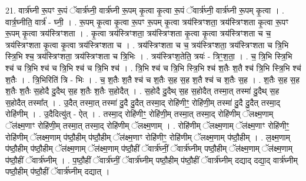 \documentclass[17pt]{extarticle}
\begin{document}
21. वार्त्र॑घ्नी रू॒पꣳ रू॒पं ॅवार्त्र॑घ्नी॒ वार्त्र॑घ्नी रू॒पम् कृ॒त्वा कृ॒त्वा रू॒पं ॅवार्त्र॑घ्नी॒ वार्त्र॑घ्नी रू॒पम् कृ॒त्वा । . वार्त्र॒घ्नीति॒ वार्त्र॑ - घ्नी॒ । . रू॒पम् कृ॒त्वा कृ॒त्वा रू॒पꣳ रू॒पम् कृ॒त्वा त्रय॑स्त्रिꣳशता॒ त्रय॑स्त्रिꣳशता कृ॒त्वा रू॒पꣳ रू॒पम् कृ॒त्वा त्रय॑स्त्रिꣳशता । . कृ॒त्वा त्रय॑स्त्रिꣳशता॒ त्रय॑स्त्रिꣳशता कृ॒त्वा कृ॒त्वा त्रय॑स्त्रिꣳशता च च॒ त्रय॑स्त्रिꣳशता कृ॒त्वा कृ॒त्वा त्रय॑स्त्रिꣳशता च । . त्रय॑स्त्रिꣳशता च च॒ त्रय॑स्त्रिꣳशता॒ त्रय॑स्त्रिꣳशता च त्रि॒भि स्त्रि॒भि श्च॒ त्रय॑स्त्रिꣳशता॒ त्रय॑स्त्रिꣳशता च त्रि॒भिः । . त्रय॑स्त्रिꣳश॒तेति॒ त्रयः॑ - त्रिꣳ॒॒श॒ता॒ । . च॒ त्रि॒भि स्त्रि॒भि श्च॑ च त्रि॒भि श्च॑ च त्रि॒भि श्च॑ च त्रि॒भि श्च॑ । . त्रि॒भि श्च॑ च त्रि॒भि स्त्रि॒भि श्च॑ श॒तैः श॒तै श्च॑ त्रि॒भि स्त्रि॒भि श्च॑ श॒तैः । . त्रि॒भिरिति॑ त्रि - भिः । . च॒ श॒तैः श॒तै श्च॑ च श॒तैः स॒ह स॒ह श॒तै श्च॑ च श॒तैः स॒ह । . श॒तैः स॒ह स॒ह श॒तैः श॒तैः स॒होदै दु॒दैथ् स॒ह श॒तैः श॒तैः स॒होदैत् । . स॒होदै दु॒दैथ् स॒ह स॒होदैत् तस्मा॒त् तस्मा॑ दु॒दैथ् स॒ह स॒होदैत् तस्मा᳚त् । . उ॒दैत् तस्मा॒त् तस्मा॑ दु॒दै दु॒दैत् तस्मा॒द् रोहि॑णीꣳ॒॒ रोहि॑णी॒म् तस्मा॑ दु॒दै दु॒दैत् तस्मा॒द् रोहि॑णीम् । . उ॒दैदित्यु॑त् - ऐत् । . तस्मा॒द् रोहि॑णीꣳ॒॒ रोहि॑णी॒म् तस्मा॒त् तस्मा॒द् रोहि॑णीम् ॅलक्ष्म॒णाम् ॅल॑क्ष्म॒णाꣳ रोहि॑णी॒म् तस्मा॒त् तस्मा॒द् रोहि॑णीम् ॅलक्ष्म॒णाम् । . रोहि॑णीम् ॅलक्ष्म॒णाम् ॅल॑क्ष्म॒णाꣳ रोहि॑णीꣳ॒॒ रोहि॑णीम् ॅलक्ष्म॒णाम् प॑ष्ठौ॒हीम् प॑ष्ठौ॒हीम् ॅल॑क्ष्म॒णाꣳ रोहि॑णीꣳ॒॒ रोहि॑णीम् ॅलक्ष्म॒णाम् प॑ष्ठौ॒हीम् । . ल॒क्ष्म॒णाम् प॑ष्ठौ॒हीम् प॑ष्ठौ॒हीम् ॅल॑क्ष्म॒णाम् ॅल॑क्ष्म॒णाम् प॑ष्ठौ॒हीं ॅवार्त्र॑घ्नीं॒ ॅवार्त्र॑घ्नीम् पष्ठौ॒हीम् ॅल॑क्ष्म॒णाम् ॅल॑क्ष्म॒णाम् प॑ष्ठौ॒हीं ॅवार्त्र॑घ्नीम् । . प॒ष्ठौ॒हीं ॅवार्त्र॑घ्नीं॒ ॅवार्त्र॑घ्नीम् पष्ठौ॒हीम् प॑ष्ठौ॒हीं ॅवार्त्र॑घ्नीम् दद्याद् दद्या॒द् वार्त्र॑घ्नीम् पष्ठौ॒हीम् प॑ष्ठौ॒हीं ॅवार्त्र॑घ्नीम् दद्यात् । \newline
\end{document}
